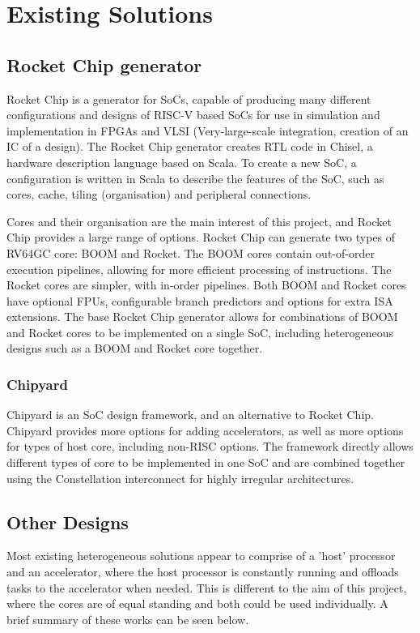\documentclass[a4paper,fleqn,11pt]{article}
\begin{document}
\section{Existing Solutions}
\subsection{Rocket Chip generator}
Rocket Chip\cite{rocketchip} is a generator for SoCs, capable of producing many different configurations and designs of RISC-V based SoCs for use in simulation and implementation in FPGAs and VLSI (Very-large-scale integration, creation of an IC of a design). The Rocket Chip generator creates RTL code in Chisel, a hardware description language based on Scala. To create a new SoC, a configuration is written in Scala to describe the features of the SoC, such as cores, cache, tiling (organisation) and peripheral connections. 

Cores and their organisation are the main interest of this project, and Rocket Chip provides a large range of options. Rocket Chip can generate two types of RV64GC core: BOOM\cite{zhaosonicboom} and Rocket. The BOOM cores contain out-of-order execution pipelines, allowing for more efficient processing of instructions. The Rocket cores are simpler, with in-order pipelines. Both BOOM and Rocket cores have optional FPUs, configurable branch predictors and options for extra ISA extensions. The base Rocket Chip generator allows for combinations of BOOM and Rocket cores to be implemented on a single SoC, including heterogeneous designs such as a BOOM and Rocket core together. 

\subsubsection{Chipyard}
Chipyard\cite{chipyard} is an SoC design framework, and an alternative to Rocket Chip. Chipyard provides more options for adding accelerators, as well as more options for types of host core, including non-RISC options. The framework directly allows different types of core to be implemented in one SoC and are combined together using the Constellation interconnect for highly irregular architectures.

\subsection{Other Designs}
Most existing heterogeneous solutions appear to comprise of a 'host' processor and an accelerator, where the host processor is constantly running and offloads tasks to the accelerator when needed. This is different to the aim of this project, where the cores are of equal standing and both could be used individually. A brief summary of these works can be seen below.
\end{document}
